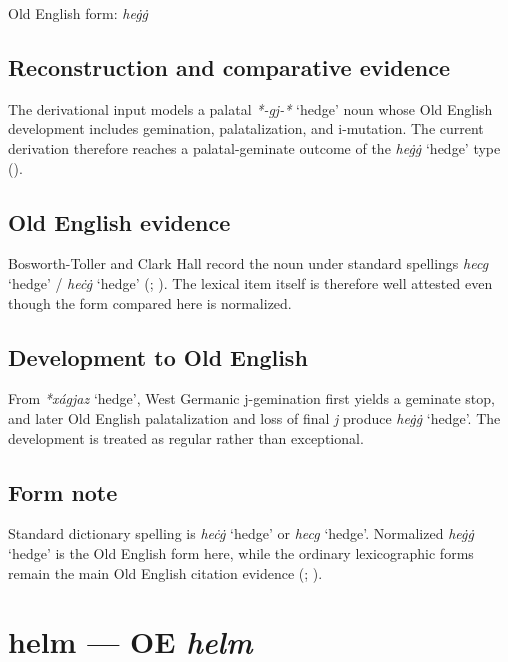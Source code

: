 \documentclass[
  british,
  a4paper,
  openany]{book}
\providecommand{\Recon}[1]{\emph{*#1}}
{\catcode`→=\active \global\def→{\ensuremath{\rightarrow}}}
\providecommand{\texorpdfstring}[2]{#1}
\providecommand{\Recon}[1]{\emph{*#1}}
{\catcode`→=\active \global\def→{\ensuremath{\rightarrow}}}
\begin{document}
Old English form: \emph{heġġ}

\subsection{Reconstruction and comparative
evidence}\label{reconstruction-and-comparative-evidence-27}

The derivational input models a palatal \Recon{-gj-*} `hedge' noun whose
Old English development includes gemination, palatalization, and
i-mutation. The current derivation therefore reaches a palatal-geminate
outcome of the \emph{heġġ} `hedge' type
().

\subsection{Old English evidence}\label{old-english-evidence-27}

Bosworth-Toller and Clark Hall record the noun under standard spellings
\emph{hecg} `hedge' / \emph{heċġ} `hedge'
(;
). The lexical item itself
is therefore well attested even though the form compared here is
normalized.

\subsection{Development to Old
English}\label{development-to-old-english-27}

From \Recon{xágjaz} `hedge', West Germanic j-gemination first yields a
geminate stop, and later Old English palatalization and loss of final
\emph{j} produce \emph{heġġ} `hedge'. The development is treated as
regular rather than exceptional.

\subsection{Form note}\label{form-note-6}

Standard dictionary spelling is \emph{heċġ} `hedge' or \emph{hecg}
`hedge'. Normalized \emph{heġġ} `hedge' is the Old English form here,
while the ordinary lexicographic forms remain the main Old English
citation evidence (; ).

\section{\texorpdfstring{helm --- OE
\emph{helm}}{helm --- OE helm}}\label{helm-oe-helm}
\end{document}
